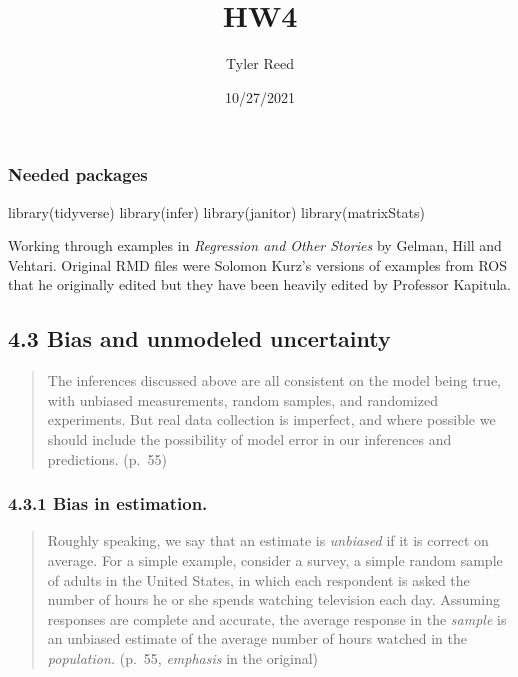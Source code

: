 \documentclass[
]{article}
\title{HW4}
\author{Tyler Reed}
\date{10/27/2021}
\newenvironment{Shaded}{\begin{snugshade}}{\end{snugshade}}
\newcommand{\FunctionTok}[1]{\textcolor[rgb]{0.00,0.00,0.00}{#1}}
\newcommand{\NormalTok}[1]{#1}
\begin{document}
\maketitle

\hypertarget{needed-packages}{%
\subsubsection*{Needed packages}\label{needed-packages}}

\begin{Shaded}
\begin{Highlighting}[]
\FunctionTok{library}\NormalTok{(tidyverse)}
\FunctionTok{library}\NormalTok{(infer)}
\FunctionTok{library}\NormalTok{(janitor)}
\FunctionTok{library}\NormalTok{(matrixStats)}
\end{Highlighting}
\end{Shaded}

Working through examples in \emph{Regression and Other Stories} by
Gelman, Hill and Vehtari. Original RMD files were Solomon Kurz's
versions of examples from ROS that he originally edited but they have
been heavily edited by Professor Kapitula.

\hypertarget{bias-and-unmodeled-uncertainty}{%
\subsection{4.3 Bias and unmodeled
uncertainty}\label{bias-and-unmodeled-uncertainty}}

\begin{quote}
The inferences discussed above are all consistent on the model being
true, with unbiased measurements, random samples, and randomized
experiments. But real data collection is imperfect, and where possible
we should include the possibility of model error in our inferences and
predictions. (p.~55)
\end{quote}

\hypertarget{bias-in-estimation.}{%
\subsubsection{4.3.1 Bias in estimation.}\label{bias-in-estimation.}}

\begin{quote}
Roughly speaking, we say that an estimate is \emph{unbiased} if it is
correct on average. For a simple example, consider a survey, a simple
random sample of adults in the United States, in which each respondent
is asked the number of hours he or she spends watching television each
day. Assuming responses are complete and accurate, the average response
in the \emph{sample} is an unbiased estimate of the average number of
hours watched in the \emph{population.} (p.~55, \emph{emphasis} in the
original)
\end{quote}
\end{document}
